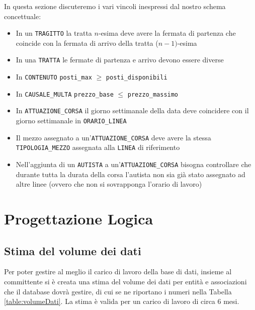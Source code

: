 \documentclass[12pt,a4paper]{report}
\begin{document}
In questa sezione discuteremo i vari vincoli inespressi dal nostro schema concettuale:
\begin{itemize}
  \item In un \texttt{TRAGITTO} la tratta $n$-esima deve avere la fermata di partenza che coincide con la fermata di arrivo della tratta ($n-1)$-esima
  \item In una \texttt{TRATTA} le fermate di partenza e arrivo devono essere diverse
  \item In \texttt{CONTENUTO} \texttt{posti\_max} $ \geq $ \texttt{posti\_disponibili}
  \item In \texttt{CAUSALE\_MULTA} \texttt{prezzo\_base} $ \leq $ \texttt{prezzo\_massimo}
  \item In \texttt{ATTUAZIONE\_CORSA} il giorno settimanale della data deve coincidere con il giorno settimanale in \texttt{ORARIO\_LINEA}
  \item Il mezzo assegnato a un'\texttt{ATTUAZIONE\_CORSA} deve avere la stessa \texttt{TIPOLOGIA\_MEZZO} assegnata alla \texttt{LINEA} di riferimento
  \item Nell'aggiunta di un \texttt{AUTISTA} a un'\texttt{ATTUAZIONE\_CORSA} bisogna controllare che durante tutta la durata della corsa l'autista non sia già stato assegnato ad altre linee (ovvero che non si sovrapponga l'orario di lavoro)
\end{itemize}

\chapter{Progettazione Logica}
\section{Stima del volume dei dati}
Per poter gestire al meglio il carico di lavoro della base di dati, insieme al committente si è creata una stima del volume dei dati per entità e associazioni che il database dovrà gestire, di cui se ne riportano i numeri nella Tabella \ref{table:volumeDati}.
La stima è valida per un carico di lavoro di circa 6 mesi.
\end{document}
